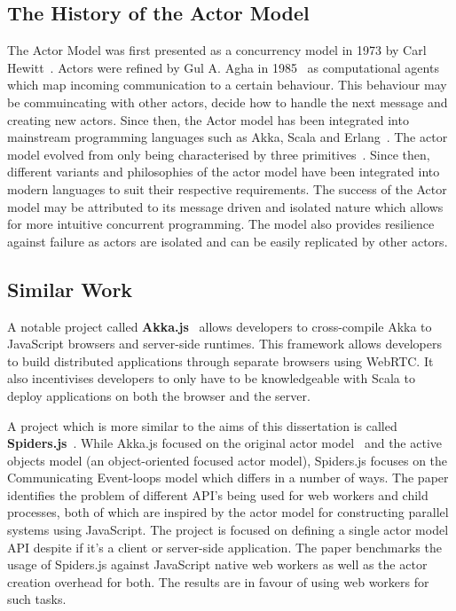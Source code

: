 \documentclass[12pt, a4paper]{report}
\theoremstyle{definition}
\theoremstyle{definition}%
\theoremstyle{definition}%
\theoremstyle{definition}%
\theoremstyle{definition}%
\theoremstyle{definition}%
\begin{document}
\subsection{The History of the Actor Model}
The Actor Model was first presented as a concurrency model in 1973 by Carl Hewitt~\cite{hewitt1973session}. Actors were refined by Gul A. Agha in 1985~\cite{agha1985actors} as computational agents which map incoming communication to a certain behaviour. This behaviour may be commuincating with other actors, decide how to handle the next message and creating new actors. Since then, the Actor model has been integrated into mainstream programming languages such as Akka, Scala and Erlang~\cite{43years}\cite{haller2012integration}. The actor model evolved from only being characterised by three primitives~\cite{agha1985actors}. Since then, different variants and philosophies of the actor model have been integrated into modern languages to suit their respective requirements. The success of the Actor model may be attributed to its message driven and isolated nature which allows for more intuitive concurrent programming. The model also provides resilience against failure as actors are isolated and can be easily replicated by other actors\cite{reactivemanifesto}.
\subsection{Similar Work}
A notable project called \textbf{Akka.js}~\cite{stivan2015akka} allows developers to cross-compile Akka to JavaScript browsers and server-side runtimes. This framework allows developers to build distributed applications through separate browsers using WebRTC. It also incentivises developers to only have to be knowledgeable with Scala to deploy applications on both the browser and the server.

A project which is more similar to the aims of this dissertation is called \textbf{Spiders.js}~\cite{spidersjs}. While Akka.js focused on the original actor model~\cite{agha1985actors} and the active objects model (an object-oriented focused actor model), Spiders.js focuses on the Communicating Event-loops model which differs in a number of ways. The paper identifies the problem of different API's being used for web workers and child processes, both of which are inspired by the actor model for constructing parallel systems using JavaScript. The project is focused on defining a single actor model API despite if it's a client or server-side application. The paper benchmarks the usage of Spiders.js against JavaScript native web workers as well as the actor creation overhead for both. The results are in favour of using web workers for such tasks.
\end{document}

